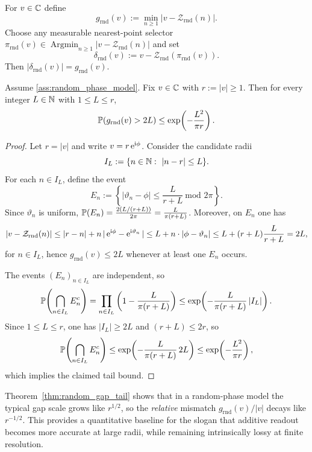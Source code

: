 \begin{definition}
\label{def:random_gap}
For $v\in\mathbb{C}$ define
$$
g_{\mathrm{rnd}}(v):=\min_{n\ge 1}|v-\mathcal{Z}_{\mathrm{rnd}}(n)|.
$$
Choose any measurable nearest-point selector $\pi_{\mathrm{rnd}}(v)\in\operatorname*{Argmin}_{n\ge 1}|v-\mathcal{Z}_{\mathrm{rnd}}(n)|$ and set
$$
\delta_{\mathrm{rnd}}(v):=v-\mathcal{Z}_{\mathrm{rnd}}(\pi_{\mathrm{rnd}}(v)).
$$
Then $|\delta_{\mathrm{rnd}}(v)|=g_{\mathrm{rnd}}(v)$.
\end{definition}

\begin{theorem}
\label{thm:random_gap_tail}
Assume \ref{ass:random_phase_model}. Fix $v\in\mathbb{C}$ with $r:=|v|\ge 1$.
Then for every integer $L\in\mathbb{N}$ with $1\le L\le r$,
$$
\mathbb{P}\!\left(g_{\mathrm{rnd}}(v)>2L\right)
\le \exp\!\left(-\frac{L^2}{\pi r}\right).
$$
\end{theorem}

\begin{proof}
Let $r=|v|$ and write $v=r\,\mathrm{e}^{\mathrm{i}\phi}$.
Consider the candidate radii
$$
I_L:=\{n\in\NN:\ |n-r|\le L\}.
$$
For each $n\in I_L$, define the event
$$
E_n:=\left\{|\vartheta_n-\phi|\le \frac{L}{r+L}\ \text{mod }2\pi\right\}.
$$
Since $\vartheta_n$ is uniform, $\mathbb{P}(E_n)=\frac{2(L/(r+L))}{2\pi}=\frac{L}{\pi(r+L)}$.
Moreover, on $E_n$ one has
$$
|v-\mathcal{Z}_{\mathrm{rnd}}(n)|
\le |r-n| + n\,|\,\mathrm{e}^{\mathrm{i}\phi}-\mathrm{e}^{\mathrm{i}\vartheta_n}\,|
\le L + n\cdot|\phi-\vartheta_n|
\le L + (r+L)\frac{L}{r+L}
= 2L,
$$
for $n\in I_L$, hence $g_{\mathrm{rnd}}(v)\le 2L$ whenever at least one $E_n$ occurs.

The events $(E_n)_{n\in I_L}$ are independent, so
$$
\mathbb{P}\!\left(\bigcap_{n\in I_L} E_n^c\right)
=\prod_{n\in I_L}\left(1-\frac{L}{\pi(r+L)}\right)
\le \exp\!\left(-\frac{L}{\pi(r+L)}\,|I_L|\right).
$$
Since $1\le L\le r$, one has $|I_L|\ge 2L$ and $(r+L)\le 2r$, so
$$
\mathbb{P}\!\left(\bigcap_{n\in I_L} E_n^c\right)\le \exp\!\left(-\frac{L}{\pi(r+L)}\,2L\right)\le \exp\!\left(-\frac{L^2}{\pi r}\right),
$$
which implies the claimed tail bound.
\end{proof}

\begin{remark}[Interpretation]
Theorem~\ref{thm:random_gap_tail} shows that in a random-phase model the typical gap scale grows like $r^{1/2}$, so the \emph{relative} mismatch $g_{\mathrm{rnd}}(v)/|v|$ decays like $r^{-1/2}$.
This provides a quantitative baseline for the slogan that additive readout becomes more accurate at large radii, while remaining intrinsically lossy at finite resolution.
\end{remark}

